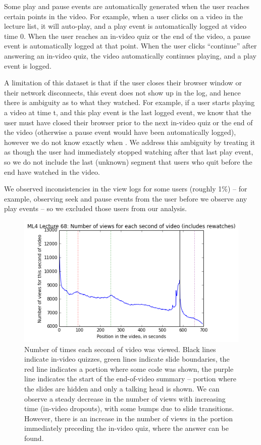 \documentclass[letterpaper]{article}
\begin{document}
Some play and pause events are automatically generated when the user reaches certain points in the video. For example, when a user clicks on a video in the lecture list, it will auto-play, and a play event is automatically logged at video time 0. When the user reaches an in-video quiz or the end of the video, a pause event is automatically logged at that point. When the user clicks ``continue'' after answering an in-video quiz, the video automatically continues playing, and a play event is logged.

A limitation of this dataset is that if the user closes their browser window or their network disconnects, this event does not show up in the log, and hence there is ambiguity as to what they watched. For example, if a user starts playing a video at time t, and this play event is the last logged event, we know that the user must have closed their browser prior to the next in-video quiz or the end of the video (otherwise a pause event would have been automatically logged), however we do not know exactly when . We address this ambiguity by treating it as though the user had immediately stopped watching after that last play event, so we do not include the last (unknown) segment that users who quit before the end have watched in the video.

We observed inconsistencies in the view logs for some users (roughly 1\%) -- for example, observing seek and pause events from the user before we observe any play events -- so we excluded those users from our analysis.

\begin{figure}
\includegraphics[width=1.0\columnwidth]{videoviewsall}
\caption{Number of times each second of video was viewed. Black lines indicate in-video quizzes, green lines indicate slide boundaries, the red line indicates a portion where some code was shown, the purple line indicates the start of the end-of-video summary -- portion where the slides are hidden and only a talking head is shown. We can observe a steady decrease in the number of views with increasing time (in-video dropouts), with some bumps due to slide transitions. However, there is an increase in the number of views in the portion immediately preceding the in-video quiz, where the answer can be found.}
\label{fig:videoviewsall}
\end{figure}
\end{document}
